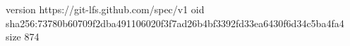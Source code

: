 version https://git-lfs.github.com/spec/v1
oid sha256:73780b60709f2dba491106020f3f7ad26b4bf3392fd33ea6430f6d34c5ba4fa4
size 874
